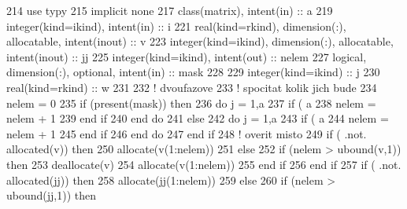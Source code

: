 \begin{DoxyCode}
214         \textcolor{keywordtype}{use }typy
215         \textcolor{keywordtype}{implicit none}
217         \textcolor{keywordtype}{class}(matrix), \textcolor{keywordtype}{intent(in)} :: a
219         \textcolor{keywordtype}{integer(kind=ikind)}, \textcolor{keywordtype}{intent(in)} :: i
221         \textcolor{keywordtype}{real(kind=rkind)}, \textcolor{keywordtype}{dimension(:)}, \textcolor{keywordtype}{allocatable}, \textcolor{keywordtype}{intent(inout)} :: v
223         \textcolor{keywordtype}{integer(kind=ikind)}, \textcolor{keywordtype}{dimension(:)}, \textcolor{keywordtype}{allocatable}, \textcolor{keywordtype}{intent(inout)} :: jj
225         \textcolor{keywordtype}{integer(kind=ikind)}, \textcolor{keywordtype}{intent(out)} :: nelem
227         \textcolor{keywordtype}{logical}, \textcolor{keywordtype}{dimension(:)}, \textcolor{keywordtype}{optional}, \textcolor{keywordtype}{intent(in)} :: mask
228 
229         \textcolor{keywordtype}{integer(kind=ikind)} :: j
230         \textcolor{keywordtype}{real(kind=rkind)} :: w
231 
232         \textcolor{comment}{! dvoufazove
}
233         \textcolor{comment}{! spocitat kolik jich bude
}
234         nelem = 0
235         \textcolor{keywordflow}{if} (\textcolor{keyword}{present}(mask)) then
236             \textcolor{keywordflow}{do} j = 1,a%
237                 \textcolor{keywordflow}{if} ( a%
238                     nelem = nelem + 1
239 \textcolor{keyword}{                end }if
240 \textcolor{keyword}{            end }do
241         else
242             \textcolor{keywordflow}{do} j = 1,a%
243                 \textcolor{keywordflow}{if} ( a%
244                     nelem = nelem + 1
245 \textcolor{keyword}{                end }if
246 \textcolor{keyword}{            end }do
247 \textcolor{keyword}{        end }if
248         \textcolor{comment}{! overit misto
}
249         \textcolor{keywordflow}{if} ( .not. \textcolor{keyword}{allocated}(v)) then
250         \textcolor{keyword}{allocate}(v(1:nelem))
251         else
252             \textcolor{keywordflow}{if} (nelem > ubound(v,1)) then
253                 \textcolor{keyword}{deallocate}(v)
254                 \textcolor{keyword}{allocate}(v(1:nelem))
255 \textcolor{keyword}{            end }if
256 \textcolor{keyword}{        end }if
257         \textcolor{keywordflow}{if} ( .not. \textcolor{keyword}{allocated}(jj)) then
258         \textcolor{keyword}{allocate}(jj(1:nelem))
259         else
260             \textcolor{keywordflow}{if} (nelem > ubound(jj,1)) then

\end{DoxyCode}
